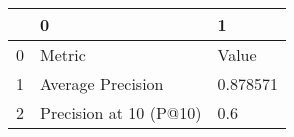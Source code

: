 \begin{tabular}{lll}
\toprule
{} &                       0 &         1 \\
\midrule
0 &                  Metric &     Value \\
1 &       Average Precision &  0.878571 \\
2 &  Precision at 10 (P@10) &       0.6 \\
\bottomrule
\end{tabular}
